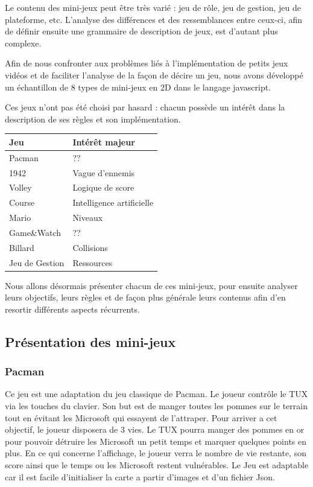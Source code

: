 Le contenu des mini-jeux peut être très varié : jeu de rôle, jeu de gestion, jeu de plateforme, etc.
L'analyse des différences et des ressemblances entre ceux-ci, afin de définir ensuite une grammaire de description de jeux, est d'autant plus complexe.

Afin de nous confronter aux problèmes liés à l'implémentation de petits jeux vidéos et de faciliter l'analyse de la façon de décire un jeu, 
nous avons développé un échantillon de 8 types de mini-jeux en 2D dans le langage javascript.

Ces jeux n'ont pas été choisi par hasard : chacun possède un intérêt dans la description de ses règles et son implémentation.

\vspace{0.5cm}

\begin{tabular}{l|l}
 Jeu & Intérêt majeur \\
 \hline
 Pacman & ?? \\
 1942 & Vague d'ennemis \\
 Volley & Logique de score \\
 Course & Intelligence artificielle \\
 Mario & Niveaux \\
 Game\&Watch & ?? \\
 Billard & Collisions \\
 Jeu de Gestion & Ressources \\
\end{tabular}

\vspace{0.5cm}

Nous allons désormais présenter chacun de ces mini-jeux, pour ensuite analyser leurs objectifs, 
leurs règles et de façon plus générale leurs contenus afin d'en resortir différents aspects récurrents.

\subsection{Présentation des mini-jeux}


\subsubsection{Pacman}

Ce jeu est une adaptation du jeu classique de Pacman. 
Le joueur contrôle le TUX via les touches du clavier. 
Son but est de manger toutes les pommes sur le terrain tout en évitant les Microsoft qui essayent de l’attraper. 
Pour arriver a cet objectif, le joueur disposera de 3 vies. Le TUX pourra manger des pommes en or pour pouvoir détruire les Microsoft 
un petit temps et marquer quelques points en plus. En ce qui concerne l’affichage, le joueur verra le nombre de vie restante, 
son score ainsi que le temps ou les Microsoft restent vulnérables. Le Jeu est adaptable car il est facile d’initialiser 
la carte a partir d’images et d’un fichier Json.

